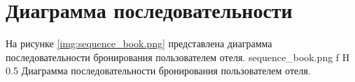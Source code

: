 \section{Диаграмма последовательности}
На рисунке \ref{img:sequence_book.png} представлена диаграмма последовательности бронирования пользователем отеля.
{sequence_book.png}
{f}
{H}
{0.5\textheight}
{Диаграмма последовательности бронирования пользователем отеля.}
